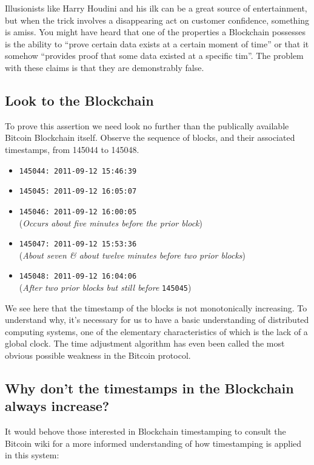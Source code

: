 Illusionists like Harry Houdini and his ilk can be a great source of entertainment, but when the trick involves a disappearing act on customer confidence, something is amiss. You might have heard that one of the properties a Blockchain possesses is the ability to ``prove certain data exists at a certain moment of time'' or that it somehow ``provides proof that some data existed at a specific tim''. 
The problem with these claims is that they are demonstrably false. 

\subsection*{Look to the Blockchain}

To prove this assertion we need look no further than the publically available Bitcoin Blockchain itself. 
Observe the sequence of blocks, and their associated timestamps, from 145044 to 145048.

\begin{itemize}
\item \texttt{145044: 2011-09-12 15:46:39}
\item \texttt{145045: 2011-09-12 16:05:07}
\item \texttt{145046: 2011-09-12 16:00:05} \\(\textit{Occurs about five minutes before the prior block})
\item \texttt{145047: 2011-09-12 15:53:36} \\(\textit{About seven & about twelve minutes before two prior blocks})
\item \texttt{145048: 2011-09-12 16:04:06} \\(\textit{After two prior blocks but still before} \texttt{145045})
\end{itemize}

We see here that the timestamp of the blocks is not monotonically increasing. 
To understand why, it's necessary for us to have a basic understanding of distributed computing systems, one of the elementary characteristics of which is the lack of a global clock. 
The time adjustment algorithm has even been called the most obvious possible weakness in the Bitcoin protocol.

\subsection*{Why don't the timestamps in the Blockchain always increase?}

It would behove those interested in Blockchain timestamping to consult the Bitcoin wiki for a more informed understanding of how timestamping is applied in this system:

